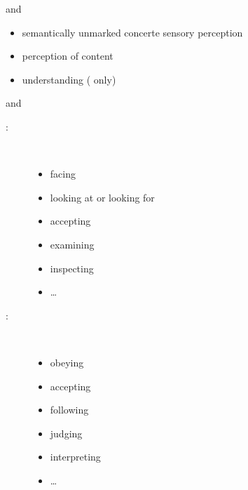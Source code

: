 
\begin{frame}{ and }
	\begin{itemize}
		\item semantically unmarked concerte sensory perception
		\item perception of content
		\item understanding ( only)
	\end{itemize}
\end{frame}


\begin{frame}{ and }
	\begin{description}
		\item [:] ~
			\begin{itemize}
				\item facing
				\item looking at or looking for
				\item accepting
				\item examining
				\item inspecting
				\item …
			\end{itemize}
		\item [:] ~
			\begin{itemize}
				\item obeying
				\item accepting
				\item following
				\item judging
				\item interpreting
				\item …
			\end{itemize}
	\end{description}
\end{frame}
